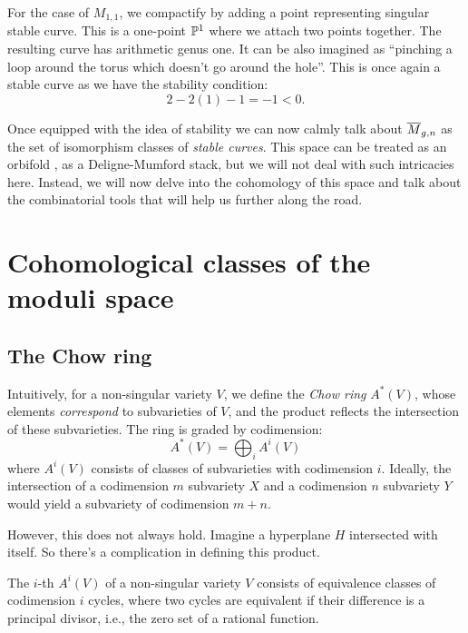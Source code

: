 \documentclass[12pt]{memoir}
\begin{document}
\begin{Ex}
    For the case of $M_{1,1}$, we compactify by adding a point representing singular stable curve. This is a one-point $\mathbb{P}^1$ where we attach two points together. The resulting curve has arithmetic genus one. It can be also imagined as ``pinching a loop around the torus which doesn't go around the hole''. This is once again a stable curve as we have the stability condition:
    $$2-2(1)-1=-1<0.$$
\end{Ex}

Once equipped with the idea of stability we can now calmly talk about $\overline M_{g,n}$ as the set of isomorphism classes of \emph{stable curves}. This space can be treated as an orbifold \cite{ZvonkineIntro}, as a Deligne-Mumford stack, but we will not deal with such intricacies here. Instead, we will now delve into the cohomology of this space and talk about the combinatorial tools that will help us further along the road.

\section{Cohomological classes of the moduli space}

\subsection{The Chow ring}
Intuitively, for a non-singular variety $V$, we define the \emph{Chow ring} $A^\ast(V)$, whose elements \emph{correspond} to subvarieties of $V$, and the product reflects the intersection of these subvarieties. The ring is graded by codimension:
$$A^\ast(V) = \bigoplus_i A^i(V)$$
where $A^i(V)$ consists of classes of subvarieties with codimension $i$. Ideally, the intersection of a codimension $m$ subvariety $X$ and a codimension $n$ subvariety $Y$ would yield a subvariety of codimension $m+n$.\par
However, this does not always hold. Imagine a hyperplane $H$ intersected with itself. So there's a complication in defining this product.

\begin{Def}
    The $i$-th  $A^i(V)$ of a non-singular variety $V$ consists of equivalence classes of codimension $i$ cycles, where two cycles are equivalent if their difference is a principal divisor, i.e., the zero set of a rational function.
\end{Def}
\end{document}
